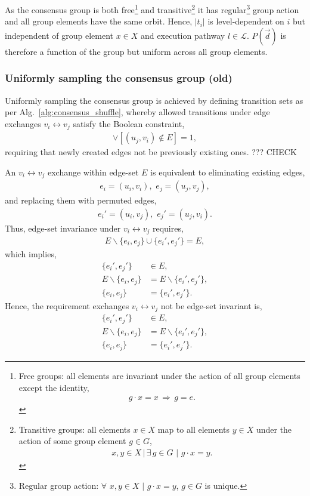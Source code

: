 As the consensus group is both free\footnote{Free groups: all elements are invariant under the action of all group elements except the identity,
	\begin{align}
		g\cdot x = x\, \Rightarrow\, g=e.\nonumber
	\end{align}} and transitive\footnote{Transitive groups: all elements $x\in X$ map to all elements $y\in X$ under the action of some group element $g\in G$,
	\begin{align}
		x,y\in X \,|\, \exists\, g\in G \,\,|\,\, g\cdot x=y.\nonumber
	\end{align}}
it has regular\footnote{Regular group action: $\forall\,\,x,y\in X \,\,|\,\, g\cdot x=y$, $g\in G$ is unique.} group action and all group elements have the same orbit. Hence, $|t_i|$ is level-dependent on $i$ but independent of group element $x\in X$ and execution pathway $l\in\mathcal{L}$. $P(\vec{d})$ is therefore a function of the group but uniform across all group elements.

\subsubsection{Uniformly sampling the consensus group (old)}

Uniformly sampling the consensus group is achieved by defining transition sets as per Alg.~\ref{alg:consensus_shuffle}, whereby allowed transitions under edge exchanges \mbox{$v_i\leftrightarrow v_j$} satisfy the Boolean constraint,
\begin{align}
	[(u_i,v_j) \not\in E] \lor [(u_j,v_i)	\not\in E] = 1,
\end{align}
requiring that newly created edges not be previously existing ones. ??? CHECK

An \mbox{$v_i\leftrightarrow v_j$} exchange within edge-set $E$ is equivalent to eliminating existing edges,
\begin{align}
	e_i = (u_i,v_i),\,\, e_j = (u_j,v_j),
\end{align}
and replacing them with permuted edges,
\begin{align}
	e_i' = (u_i,v_j),\,\, e_j' = (u_j,v_i).
\end{align}
Thus, edge-set invariance under \mbox{$v_i\leftrightarrow v_j$} requires,
\begin{align}
	E \backslash \{e_i,e_j\} \cup \{e_i',e_j'\} = E,
\end{align}
which implies,
\begin{align}
	\{e_i',e_j'\}            & \in E,\nonumber                        \\
	E \backslash \{e_i,e_j\} & = E \backslash \{e_i',e_j'\},\nonumber \\
	\{e_i,e_j\}              & =\{e_i',e_j'\}.
\end{align}
Hence, the requirement exchanges \mbox{$v_i\leftrightarrow v_j$} not be edge-set invariant is,
\begin{align}
	\{e_i',e_j'\}            & \in E,\nonumber                        \\
	E \backslash \{e_i,e_j\} & = E \backslash \{e_i',e_j'\},\nonumber \\
	\{e_i,e_j\}              & =\{e_i',e_j'\}.
\end{align}

